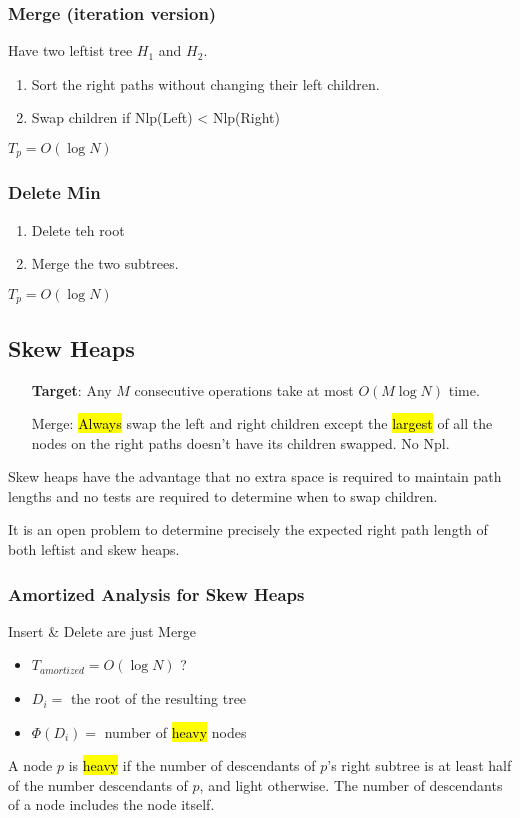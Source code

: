 \subsubsection{Merge (iteration version)}
Have two leftist tree $H_1$ and $H_2$. 
\begin{enumerate}
    \item Sort the right paths without changing their left children. 
    \item Swap children if Nlp(Left) < Nlp(Right)
\end{enumerate}

$T_p=O(\log N)$

\subsubsection{Delete Min}
\begin{enumerate}
    \item Delete teh root
    \item Merge the two subtrees. 
\end{enumerate}

$T_p=O(\log N)$

\subsection{Skew Heaps}
\begin{itemize}\small
    \item [\textbf{Target}:] Any $M$ consecutive operations take at most $O(M\log N)$ time. 
    \item [Merge:] \hl{Always} swap the left and right children  except the \hl{largest} of all the nodes on the right paths doesn't have its children swapped. No Npl. 
\end{itemize}

Skew heaps have the advantage that no extra space is required to maintain path lengths and no tests are required to determine when to swap children.

It is an open problem to determine precisely the expected right path length of both leftist and skew heaps.

\subsubsection{Amortized Analysis for Skew Heaps}
Insert \& Delete are just Merge
\begin{itemize}
    \item $T_{amortized}=O(\log N)$ ?
    \item $D_i=$ the root of the resulting tree 
    \item $\Phi(D_i)=$ number of \hl{heavy} nodes
\end{itemize}
\begin{definition}
    A node $p$ is \hl{heavy} if the number of descendants of $p$'s right subtree is at least half of the number descendants of $p$, and \textcolor{light_green}{light} otherwise. The number of descendants of a node includes the node itself. 
\end{definition}

